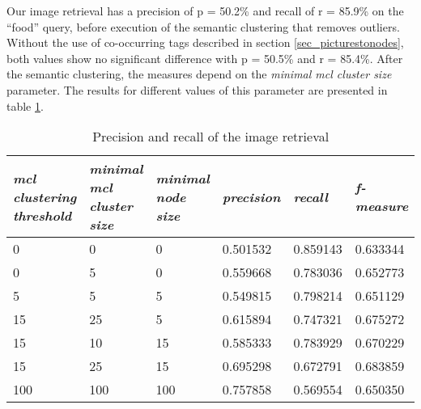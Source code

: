 Our image retrieval has a precision of p = 50.2\% and recall of r = 85.9\% on the ``food'' query, before execution of the semantic clustering that removes outliers. Without the use of co-occurring tags described in section \ref{sec_picturestonodes}, both values show no significant difference with p = 50.5\% and r = 85.4\%.
After the semantic clustering, the measures depend on the \emph{minimal mcl cluster size} parameter. The results for different values of this parameter are presented in table \ref{tab_retrievalevaluation}.\\

\begin{table}[h]
   \begin{tabular}{| p{2.2cm}| p{2.2cm}| p{2cm} || p{2cm} | p{2cm} | p{2cm} |}
    \hline
    \emph{mcl clustering threshold} & \emph{minimal mcl cluster size} & \emph{minimal node size} & \emph{precision} & \emph{recall} & \emph{f-measure} \\ \hline
    0 	& 0 	& 0 & 0.501532 & 0.859143 & 0.633344 \\ \hline
    0 	& 5 	& 0 & 0.559668 & 0.783036 & 0.652773 \\ \hline
    5 	& 5 	& 5 & 0.549815 & 0.798214 & 0.651129 \\ \hline     
    15 	& 25 &  5 & 0.615894 & 0.747321 & 0.675272 \\ \hline
    15 	& 10 & 15 & 0.585333 & 0.783929 & 0.670229 \\ \hline
    15 	& 25 & 15 & 0.695298 & 0.672791 & 0.683859 \\ \hline
    	100 	& 100 & 100 & 0.757858 & 0.569554 & 0.650350 \\ \hline
    \end{tabular}
    \caption{Precision and recall of the image retrieval}
	\label{tab_retrievalevaluation}
\end{table}

